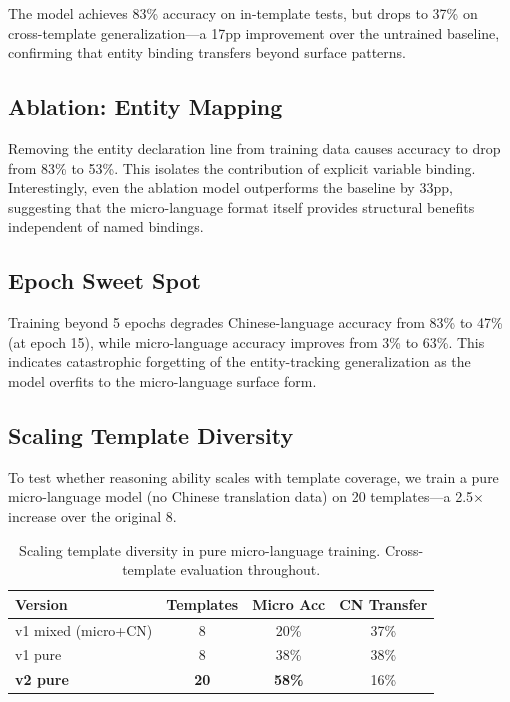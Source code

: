 \documentclass[11pt,a4paper]{article}
\begin{document}
The model achieves 83\% accuracy on in-template tests, but drops to 37\% on cross-template generalization—a 17pp improvement over the untrained baseline, confirming that entity binding transfers beyond surface patterns.

\subsection{Ablation: Entity Mapping}

Removing the entity declaration line from training data causes accuracy to drop from 83\% to 53\%.
This isolates the contribution of explicit variable binding.
Interestingly, even the ablation model outperforms the baseline by 33pp, suggesting that the micro-language format itself provides structural benefits independent of named bindings.

\subsection{Epoch Sweet Spot}

Training beyond 5 epochs degrades Chinese-language accuracy from 83\% to 47\% (at epoch 15), while micro-language accuracy improves from 3\% to 63\%.
This indicates catastrophic forgetting of the entity-tracking generalization as the model overfits to the micro-language surface form.

\subsection{Scaling Template Diversity}

To test whether reasoning ability scales with template coverage, we train a pure micro-language model (no Chinese translation data) on 20 templates—a 2.5$\times$ increase over the original 8.

\begin{table}[h]
\centering
\begin{tabular}{lccc}
\toprule
\textbf{Version} & \textbf{Templates} & \textbf{Micro Acc} & \textbf{CN Transfer} \\
\midrule
v1 mixed (micro+CN) & 8   & 20\% & 37\% \\
v1 pure             & 8   & 38\% & 38\% \\
\textbf{v2 pure}    & \textbf{20} & \textbf{58\%} & 16\% \\
\bottomrule
\end{tabular}
\caption{Scaling template diversity in pure micro-language training. Cross-template evaluation throughout.}
\label{tab:scaling}
\end{table}
\end{document}
